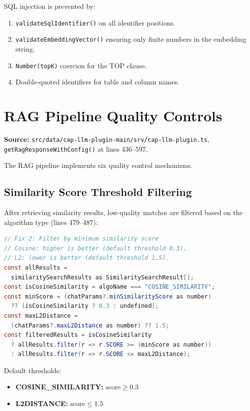 \documentclass[11pt]{article}
\begin{document}
SQL injection is prevented by:
\begin{enumerate}
  \item \texttt{validateSqlIdentifier()} on all identifier positions.
  \item \texttt{validateEmbeddingVector()} ensuring only finite numbers in the
        embedding string.
  \item \texttt{Number(topK)} coercion for the TOP clause.
  \item Double-quoted identifiers for table and column names.
\end{enumerate}

\section{RAG Pipeline Quality Controls}
\label{sec:rag-quality}

\noindent\textbf{Source:}
\texttt{src/data/cap-llm-plugin-main/srv/cap-llm-plugin.ts},
\texttt{getRagResponseWithConfig()} at lines 436--597.

The RAG pipeline implements six quality control mechanisms.

\subsection{Similarity Score Threshold Filtering}

After retrieving similarity results, low-quality matches are filtered based on
the algorithm type (lines 479--487):

\begin{lstlisting}[language=Java,caption={Score threshold filtering --- lines 479--487}]
// Fix 2: Filter by minimum similarity score
// Cosine: higher is better (default threshold 0.3).
// L2: lower is better (default threshold 1.5).
const allResults =
  similaritySearchResults as SimilaritySearchResult[];
const isCosineSimilarity = algoName === "COSINE_SIMILARITY";
const minScore = (chatParams?.minSimilarityScore as number)
  ?? (isCosineSimilarity ? 0.3 : undefined);
const maxL2Distance =
  (chatParams?.maxL2Distance as number) ?? 1.5;
const filteredResults = isCosineSimilarity
  ? allResults.filter(r => r.SCORE >= (minScore as number))
  : allResults.filter(r => r.SCORE <= maxL2Distance);
\end{lstlisting}

Default thresholds:
\begin{itemize}
  \item \textbf{COSINE\_SIMILARITY:} $\text{score} \geq 0.3$
  \item \textbf{L2DISTANCE:} $\text{score} \leq 1.5$
\end{itemize}
\end{document}
